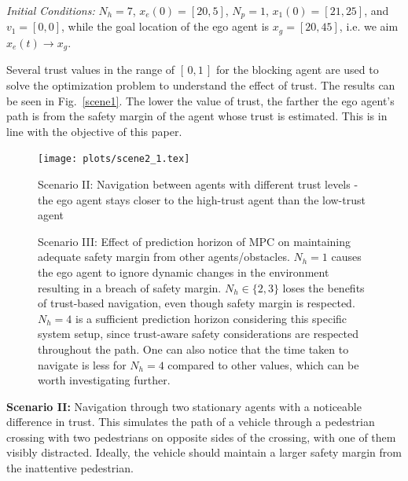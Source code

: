 \documentclass[journal]{IEEEtran}
\begin{document}
\textit{Initial Conditions: } $N_h=7$, $x_e(0) = [20, 5]$, $N_p = 1$, $x_1(0) = [21, 25]$, and $v_1 = [0, 0]$, while the goal location of the ego agent is $x_g = [20, 45]$, i.e. we aim $x_e(t) \rightarrow x_g$.

Several trust values in the range of $[\,0, 1\,]$ for the blocking agent are used to solve the optimization problem to understand the effect of trust. The results can be seen in Fig.~\ref{scene1}. The lower the value of trust, the farther the ego agent's path is from the safety margin of the agent whose trust is estimated. This is in line with the objective of this paper.



\begin{figure}
  \centering
  \texttt{[image: plots/scene2\_1.tex]}
  \caption{Scenario II: Navigation between agents with different trust levels - the ego agent stays closer to the high-trust agent than the low-trust agent}
  \label{scene2_1}
\end{figure}

\begin{figure}
    \centering
    \hfill
    \hfill
    \hfill
    \caption{Scenario III: Effect of prediction horizon of MPC on maintaining adequate safety margin from other agents/obstacles. $N_h=1$ causes the ego agent to ignore dynamic changes in the environment resulting in a breach of safety margin. $N_h \in \{2, 3\}$ loses the benefits of trust-based navigation, even though safety margin is respected. $N_h=4$ is a sufficient prediction horizon considering this specific system setup, since trust-aware safety considerations are respected throughout the path. One can also notice that the time taken to navigate is less for $N_h=4$ compared to other values, which can be worth investigating further.}\label{pred_hor}
  \end{figure}


\textbf{Scenario II:} Navigation through two stationary agents with a noticeable difference in trust. This simulates the path of a vehicle through a pedestrian crossing with two pedestrians on opposite sides of the crossing, with one of them visibly distracted. Ideally, the vehicle should maintain a larger safety margin from the inattentive pedestrian. 
 
\end{document}

